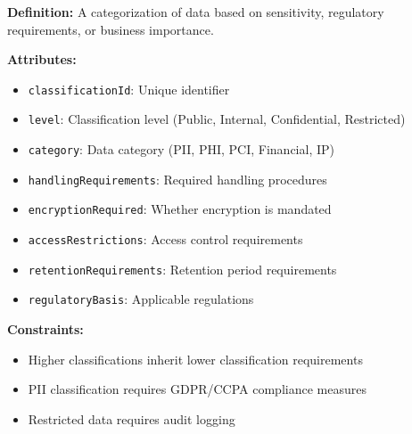 \documentclass[11pt,letterpaper]{article}
\begin{document}
\begin{definitionbox}
\textbf{Definition:} A categorization of data based on sensitivity, regulatory requirements, or business importance.

\textbf{Attributes:}
\begin{itemize}[nosep]
    \item \texttt{classificationId}: Unique identifier
    \item \texttt{level}: Classification level (Public, Internal, Confidential, Restricted)
    \item \texttt{category}: Data category (PII, PHI, PCI, Financial, IP)
    \item \texttt{handlingRequirements}: Required handling procedures
    \item \texttt{encryptionRequired}: Whether encryption is mandated
    \item \texttt{accessRestrictions}: Access control requirements
    \item \texttt{retentionRequirements}: Retention period requirements
    \item \texttt{regulatoryBasis}: Applicable regulations
\end{itemize}

\textbf{Constraints:}
\begin{itemize}[nosep]
    \item Higher classifications inherit lower classification requirements
    \item PII classification requires GDPR/CCPA compliance measures
    \item Restricted data requires audit logging
\end{itemize}
\end{definitionbox}
\end{document}
